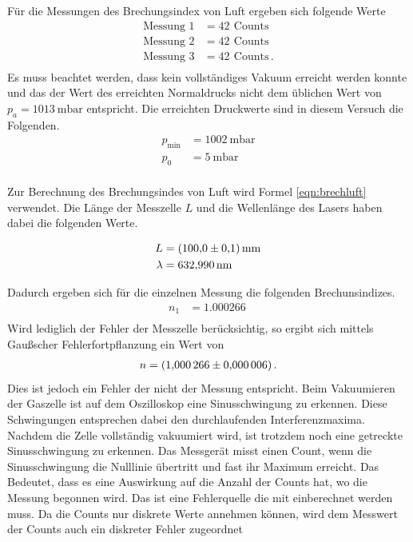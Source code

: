 Für die Messungen des Brechungsindex von Luft ergeben sich folgende Werte
\begin{align*}
  \text{Messung 1} &= \SI{42}{}\, \text{Counts} \\
  \text{Messung 2} &= \SI{42}{}\, \text{Counts} \\
  \text{Messung 3} &= \SI{42}{}\, \text{Counts} \, . \\
\end{align*}
Es muss beachtet werden, dass kein vollständiges Vakuum erreicht werden konnte
und das der Wert des erreichten Normaldrucks nicht dem üblichen Wert von
$p_a= \SI{1013}{\milli\bar}$ \cite{druck} entspricht. Die erreichten Druckwerte sind in
diesem Versuch die Folgenden.
\begin{align*}
  p_{\text{min}} &= \SI{1002}{\milli\bar} \\
  p_0            &= \SI{5}{\milli\bar} \\
\end{align*}

Zur Berechnung des Brechungsindes von Luft wird Formel \ref{eqn:brechluft}
verwendet. Die Länge der Messzelle $L$ und die Wellenlänge des Lasers
haben dabei die folgenden Werte.

\begin{align*}
  L &= \SI{100 \pm 0.1}{\milli\meter} \\
  \lambda &= \SI{632.990}{\nano\meter} \\
\end{align*}

Dadurch ergeben sich für die einzelnen Messung die folgenden Brechunsindizes.
\begin{align*}
  n_1 &= \SI{1.000266}{} \\
\end{align*}
Wird lediglich der Fehler der Messzelle berücksichtig, so ergibt sich mittels
Gaußscher Fehlerfortpflanzung ein Wert von
\begin{align*}
  n = \SI{1.000266 \pm 0.000006}{} \, .\\
\end{align*}
Dies ist jedoch ein Fehler der nicht der Messung entspricht. Beim Vakuumieren
der Gaszelle ist auf dem Oszilloskop eine Sinusschwingung zu erkennen. Diese
Schwingungen entsprechen dabei den durchlaufenden Interferenzmaxima. Nachdem
die Zelle vollständig vakuumiert wird, ist trotzdem noch eine getreckte
Sinusschwingung zu erkennen. Das Messgerät misst einen Count, wenn die
Sinusschwingung die Nulllinie übertritt und fast ihr Maximum erreicht. Das
Bedeutet, dass es eine Auswirkung auf die Anzahl der Counts hat, wo die
Messung begonnen wird. Das ist eine Fehlerquelle die mit einberechnet werden
muss. Da die Counts nur diskrete Werte annehmen können, wird dem Messwert
der Counts auch ein diskreter Fehler zugeordnet

